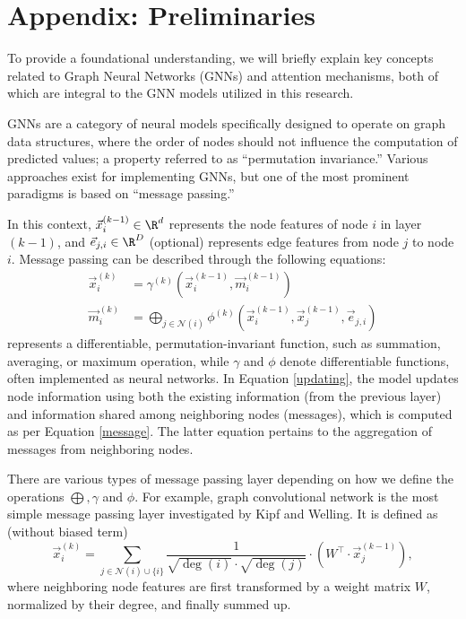 \newpage
\appendix
\section{Appendix: Preliminaries} \label{appen:prelim}

To provide a foundational understanding, we will briefly explain key concepts related to Graph Neural Networks (GNNs) and attention mechanisms, both of which are integral to the GNN models utilized in this research.

GNNs are a category of neural models specifically designed to operate on graph data structures, where the order of nodes should not influence the computation of predicted values; a property referred to as ``permutation invariance.'' Various approaches exist for implementing GNNs, but one of the most prominent paradigms is based on ``message passing.''

In this context, $\vec{x}_i^{(k-1)} \in \R^d$ represents the node features of node $i$ in layer $(k-1)$, and $\vec{e}_{j,i} \in \R^D$ (optional) represents edge features from node $j$ to node $i$. Message passing can be described through the following equations:
\begin{align}
		\vec{x}_{i}^{(k)} &= \gamma^{(k)} \left(\vec{x}_{i}^{(k-1)}, \vec{m}_{i}^{(k-1)}\right)\label{updating}\\
		\vec{m}_{i}^{(k)} &= \bigoplus_{j\in \mathcal{N}(i)} \phi^{(k)} \left(\vec{x}_{i}^{(k-1)},\vec{x}_{j}^{(k-1)}, \vec{e}_{j,i}\right)\label{message}
\end{align}
represents a differentiable, permutation-invariant function, such as summation, averaging, or maximum operation, while $\gamma$ and $\phi$ denote differentiable functions, often implemented as neural networks.
In Equation \ref{updating}, the model updates node information using both the existing information (from the previous layer) and information shared among neighboring nodes (messages), which is computed as per Equation \ref{message}. The latter equation pertains to the aggregation of messages from neighboring nodes.

There are various types of message passing layer depending on how we define the operations $\bigoplus, \gamma$ and $\phi$.
For example, graph convolutional network \cite{GCN} is the most simple message passing layer investigated by Kipf and Welling.
It is defined as (without biased term)
\begin{equation}
\vec{x}_i^{(k)} = \sum_{j \in \mathcal{N}(i) \cup \{ i \}} \frac{1}{\sqrt{\deg(i)} \cdot \sqrt{\deg(j)}} \cdot \left( W^{\top} \cdot \vec{x}_j^{(k-1)} \right),
\end{equation}
where neighboring node features are first transformed by a weight matrix $W$, normalized by their degree, and finally summed up.

